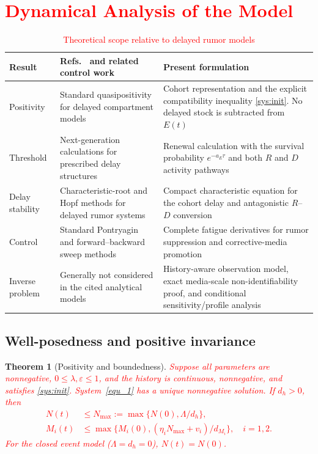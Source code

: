 \documentclass[letterpaper,journal]{IEEEtran}
\newtheorem{theorem}{Theorem}[section]
\begin{document}
	\section{\textcolor{red}{Dynamical Analysis of the Model}}
	\label{sec2}

	\begin{table}[t]
		\caption{\textcolor{red}{Theoretical scope relative to delayed rumor models}}
		\label{tab:theory_comparison}
		\centering\footnotesize
		\begin{tabularx}{\textwidth}{@{}lXX@{}}
		\toprule
		Result & Refs.~\cite{fu2025rumor,wei2025stability,sheng2025asymptotic} and related control work \cite{belhdid2024optimal} & Present formulation\\
		\midrule
		Positivity & Standard quasipositivity for delayed compartment models & Cohort representation and the explicit compatibility inequality \eqref{sys:init}. No delayed stock is subtracted from $E(t)$\\
		Threshold & Next-generation calculations for prescribed delay structures & Renewal calculation with the survival probability $e^{-a_E\tau}$ and both $R$ and $D$ activity pathways\\
		Delay stability & Characteristic-root and Hopf methods for delayed rumor systems & Compact characteristic equation for the cohort delay and antagonistic $R$--$D$ conversion\\
		Control & Standard Pontryagin and forward--backward sweep methods & Complete fatigue derivatives for rumor suppression and corrective-media promotion\\
		Inverse problem & Generally not considered in the cited analytical models & History-aware observation model, exact media-scale non-identifiability proof, and conditional sensitivity/profile analysis\\
		\bottomrule
		\end{tabularx}
	\end{table}

	\subsection{Well-posedness and positive invariance}
	\begin{theorem}[Positivity and boundedness]
		\label{thm:positive}
		\textcolor{red}{Suppose all parameters are nonnegative, $0\leq\lambda,\varepsilon\leq1$, and the history is continuous, nonnegative, and satisfies \eqref{sys:init}. System~\eqref{equ_1} has a unique nonnegative solution. If $d_h>0$, then}
		\textcolor{red}{		
		\begin{align*}
		N(t)&\leq N_{\max}:=\max\{N(0),\Lambda/d_h\},\\
		M_i(t)&\leq\max\{M_i(0),(\eta_iN_{\max}+v_i)/d_{M_i}\},\quad i=1,2.
		\end{align*}
		}
		\textcolor{red}{
		For the closed event model ($\Lambda=d_h=0$), $N(t)=N(0)$.}
	\end{theorem}
\end{document}
